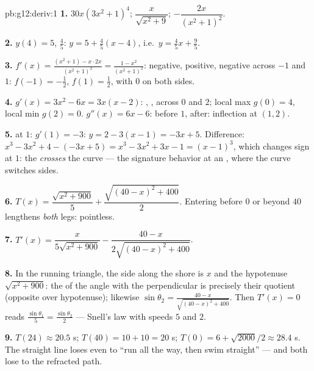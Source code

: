 \begin{solution}{pb:g12:deriv:1}
\textbf{1.} $30x\left(3x^2 + 1\right)^4$; \quad
$\dfrac{x}{\sqrt{x^2 + 9}}$; \quad
$-\dfrac{2x}{\left(x^2 + 1\right)^2}$.

\textbf{2.} $y(4) = 5$,  $\frac45$: 
$y = 5 + \frac45(x - 4)$, i.e.\ $y = \frac45 x + \frac95$.

\textbf{3.} $f'(x) = \frac{(x^2 + 1) - x \cdot 2x}{(x^2+1)^2}
= \frac{1 - x^2}{(x^2 + 1)^2}$: negative, positive, negative
across $-1$ and $1$:  $f(-1) = -\frac12$, 
$f(1) = \frac12$, with  $0$ on both sides.

\textbf{4.} $g'(x) = 3x^2 - 6x = 3x(x - 2)$: ,
,  across $0$ and $2$; local max
$g(0) = 4$, local min $g(2) = 0$. $g''(x) = 6x - 6$: 
before $1$,  after: inflection at $(1, 2)$.

\textbf{5.}  at $1$:  $g'(1) = -3$:
$y = 2 - 3(x - 1) = -3x + 5$. Difference:
$x^3 - 3x^2 + 4 - (-3x + 5) = x^3 - 3x^2 + 3x - 1 =
(x - 1)^3$, which changes sign at $1$: the 
\emph{crosses} the curve --- the signature behavior at an
, where the curve switches sides.

\textbf{6.} $T(x) = \dfrac{\sqrt{x^2 + 900}}{5} +
\dfrac{\sqrt{(40 - x)^2 + 400}}{2}$. Entering before $0$ or
beyond $40$ lengthens \emph{both} legs: pointless.

\textbf{7.} $T'(x) = \dfrac{x}{5\sqrt{x^2 + 900}} -
\dfrac{40 - x}{2\sqrt{(40 - x)^2 + 400}}$.

\textbf{8.} In the running triangle, the side along the shore
is $x$ and the hypotenuse $\sqrt{x^2 + 900}$: the  of the
angle with the perpendicular is precisely their quotient
(opposite over hypotenuse); likewise
$\sin\theta_2 = \frac{40 - x}{\sqrt{(40-x)^2 + 400}}$. Then
$T'(x) = 0$ reads
$\frac{\sin\theta_1}{5} = \frac{\sin\theta_2}{2}$ --- Snell's
law with speeds $5$ and $2$.

\textbf{9.} $T(24) \approx 20.5$ s; $T(40) = 10 + 10 = 20$ s;
$T(0) = 6 + \sqrt{2000}/2 \approx 28.4$ s. The straight line
loses even to ``run all the way, then swim straight'' --- and
both lose to the refracted path.


\end{solution}
